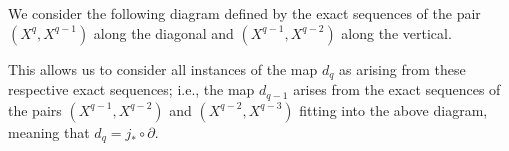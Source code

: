 \documentclass[10pt]{mypackage}
\begin{document}
\begin{solution}
  We consider the following diagram defined by the exact sequences of the pair $\left( X^q,X^{q-1} \right)$ along the diagonal and $\left( X^{q-1},X^{q-2} \right)$ along the vertical.
 \begin{center}
 \end{center} 
 This allows us to consider all instances of the map $d_q$ as arising from these respective exact sequences; i.e., the map $d_{q-1}$ arises from the exact sequences of the pairs $\left( X^{q-1},X^{q-2} \right)$  and $\left( X^{q-2},X^{q-3} \right)$ fitting into the above diagram, meaning that $d_q = j_{\ast}\circ\partial$.
\end{solution}
\end{document}
